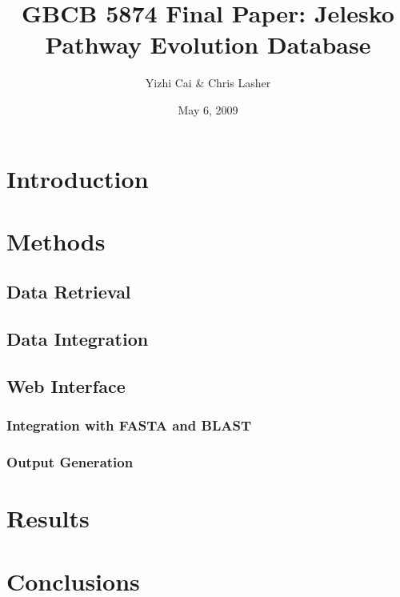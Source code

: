 \documentclass[twoside,letterpaper,11pt]{article}
\author{Yizhi Cai \& Chris Lasher}
\title{GBCB 5874 Final Paper: Jelesko Pathway Evolution Database}
\date{May 6, 2009}
\begin{document}
\maketitle

\section{Introduction}

\section{Methods}


\subsection{Data Retrieval}


\subsection{Data Integration}


\subsection{Web Interface}


\subsubsection{Integration with FASTA and BLAST}


\subsubsection{Output Generation}


\section{Results}


\section{Conclusions}
\end{document}
